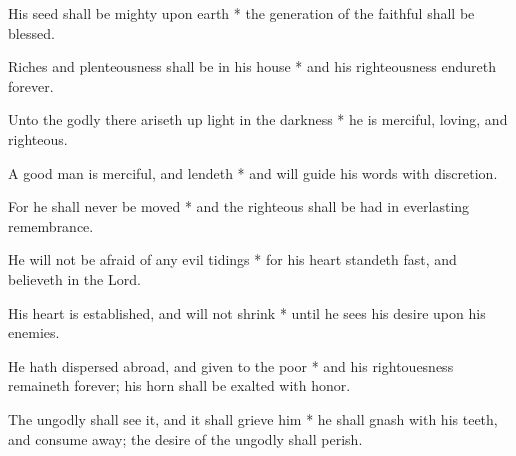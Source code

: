 \begin{multicols}{2}
	His seed shall be mighty upon earth * the generation of the faithful shall be blessed.
	
	Riches and plenteousness shall be in his house * and his righteousness endureth forever.
	
	Unto the godly there ariseth up light in the darkness * he is merciful, loving, and righteous.
	
	A good man is merciful, and lendeth * and will guide his words with discretion.
	
	For he shall never be moved * and the righteous shall be had in everlasting remembrance.
	
	He will not be afraid of any evil tidings * for his heart standeth fast, and believeth in the Lord.
	
	His heart is established, and will not shrink * until he sees his desire upon his enemies.
	
	He hath dispersed abroad, and given to the poor * and his rightouesness remaineth forever; his horn shall be exalted with honor.
	
	The ungodly shall see it, and it shall grieve him * he shall gnash with his teeth, and consume away; the desire of the ungodly shall perish.
\end{multicols}